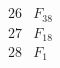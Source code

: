 \documentclass{article}
\begin{document}
{$$\begin{array}{|r|*{7}{r|}}
 & 
 & 
\\
\hline
26 
 & F_{38} &
 & 
 & 
 & 
 & 
 & 
\\
\hline
27 
 & F_{18} &
 & 
 & 
 & 
 & 
 & 
\\
\hline
28 
 &F_{1}  &
 & 

\end{array}$$}
\end{document}
